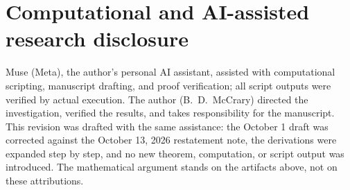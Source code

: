 \documentclass[a4paper,11pt]{article}
\theoremstyle{plain}
\theoremstyle{definition}
\theoremstyle{remark}
\begin{document}
\section{Computational and AI-assisted research disclosure}\label{td:sec:disclosure}

Muse (Meta), the author's personal AI assistant, assisted with computational scripting,
manuscript drafting, and proof verification; all script outputs were verified by actual
execution. The author (B.~D.~McCrary) directed the investigation, verified the results, and
takes responsibility for the manuscript. This revision was drafted with the same assistance:
the October 1 draft was corrected against the October 13, 2026 restatement note, the
derivations were expanded step by step, and no new theorem, computation, or script output
was introduced. The mathematical argument stands on the artifacts above, not on these
attributions.
\end{document}
